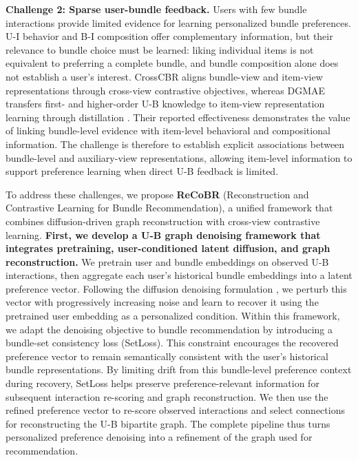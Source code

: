 \documentclass[letterpaper]{article}
\begin{document}
\textbf{Challenge 2: Sparse user-bundle feedback.} Users with few bundle interactions provide limited evidence for learning personalized bundle preferences. U-I behavior and B-I composition offer complementary information, but their relevance to bundle choice must be learned: liking individual items is not equivalent to preferring a complete bundle, and bundle composition alone does not establish a user's interest. CrossCBR aligns bundle-view and item-view representations through cross-view contrastive objectives, whereas DGMAE transfers first- and higher-order U-B knowledge to item-view representation learning through distillation \cite{ma2022crosscbr,ren2023dgmae}. Their reported effectiveness demonstrates the value of linking bundle-level evidence with item-level behavioral and compositional information. The challenge is therefore to establish explicit associations between bundle-level and auxiliary-view representations, allowing item-level information to support preference learning when direct U-B feedback is limited.

To address these challenges, we propose \textbf{ReCoBR} (Reconstruction and Contrastive Learning for Bundle Recommendation), a unified framework that combines diffusion-driven graph reconstruction with cross-view contrastive learning. \textbf{First, we develop a U-B graph denoising framework that integrates pretraining, user-conditioned latent diffusion, and graph reconstruction.} We pretrain user and bundle embeddings on observed U-B interactions, then aggregate each user's historical bundle embeddings into a latent preference vector. Following the diffusion denoising formulation \cite{ho2020ddpm,wang2023diffrec}, we perturb this vector with progressively increasing noise and learn to recover it using the pretrained user embedding as a personalized condition. Within this framework, we adapt the denoising objective to bundle recommendation by introducing a bundle-set consistency loss (SetLoss). This constraint encourages the recovered preference vector to remain semantically consistent with the user's historical bundle representations. By limiting drift from this bundle-level preference context during recovery, SetLoss helps preserve preference-relevant information for subsequent interaction re-scoring and graph reconstruction. We then use the refined preference vector to re-score observed interactions and select connections for reconstructing the U-B bipartite graph. The complete pipeline thus turns personalized preference denoising into a refinement of the graph used for recommendation.
\end{document}
